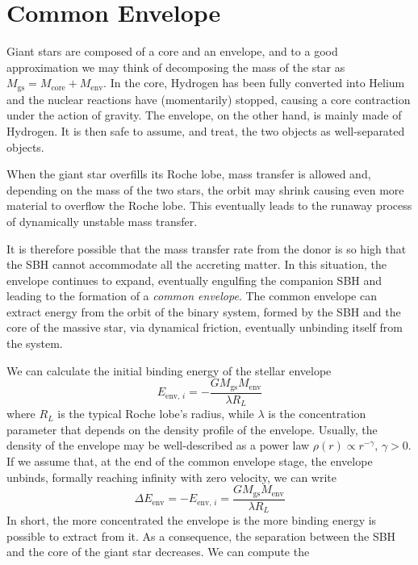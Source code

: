 \section{Common Envelope}
Giant stars are composed of a core and an envelope, and to a good approximation we may think of decomposing the mass of the star as $M_{\text{gs}} = M_{\text{core}} + M_{\text{env}}$. In the core, Hydrogen has been fully converted into Helium and the nuclear reactions have (momentarily) stopped, causing a core contraction under the action of gravity. The envelope, on the other hand, is mainly made of Hydrogen. It is then safe to assume, and treat, the two objects as well-separated objects.
\par When the giant star overﬁlls its Roche lobe, mass transfer is allowed and, depending on the mass of the two stars, the orbit may shrink causing even more material to overﬂow the Roche lobe. This eventually leads to the runaway process of dynamically unstable mass transfer.
\par It is therefore possible that the mass transfer rate from the donor is so high that the SBH cannot accommodate all the accreting matter. In this situation, the envelope continues to expand, eventually engulﬁng the companion SBH and leading to the formation of a \emph{common envelope}. The common envelope can extract energy from the orbit of the binary system, formed by the SBH and the core of the massive star, via dynamical friction, eventually unbinding itself from the system.
\par We can calculate the initial binding energy of the stellar envelope 
\begin{equation*}
    E_{\text{env},\,i} = -\frac{GM_{\text{gs}}M_{\text{env}}}{\lambda R_{L}}
\end{equation*}
where $R_{L}$ is the typical Roche lobe's radius, while $\lambda$ is the concentration parameter that depends on the density profile of the envelope. Usually, the density of the envelope may be well-described as a power law $\rho(r) \propto r^{-\gamma},\,\gamma > 0$. If we assume that, at the end of the common envelope stage, the envelope unbinds, formally reaching infinity with zero velocity, we can write
\begin{equation*}
    \Delta E_{\text{env}} = -E_{\text{env},\,i} = \frac{GM_{\text{gs}}M_{\text{env}}}{\lambda R_{L}}
\end{equation*}
In short, the more concentrated the envelope is the more binding energy is possible to extract from it. As a consequence, the separation between the SBH and the core of the giant star decreases. We can compute the

